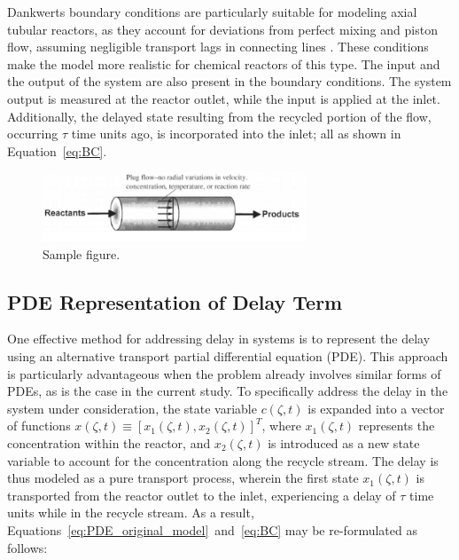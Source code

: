 Dankwerts boundary conditions are particularly suitable for modeling axial tubular reactors, as they account for deviations from perfect mixing and piston flow, assuming negligible transport lags in connecting lines \autocite{danckwerts1993continuous}. These conditions make the model more realistic for chemical reactors of this type. The input and the output of the system are also present in the boundary conditions. The system output is measured at the reactor outlet, while the input is applied at the inlet. Additionally, the delayed state resulting from the recycled portion of the flow, occurring $\tau$ time units ago, is incorporated into the inlet; all as shown in Equation~\ref{eq:BC}.


\begin{figure}[ht]
    \centering
    \includegraphics[width=0.7\textwidth]{Figures/sample.jpeg}
    \caption{Sample figure.}
    \label{fig:reactor_scheme}
\end{figure}

\subsection{PDE Representation of Delay Term}

One effective method for addressing delay in systems is to represent the delay using an alternative transport partial differential equation (PDE). This approach is particularly advantageous when the problem already involves similar forms of PDEs, as is the case in the current study. To specifically address the delay in the system under consideration, the state variable $c(\zeta, t)$ is expanded into a vector of functions $x(\zeta, t) \equiv [x_1(\zeta, t), x_2(\zeta, t)]^T$, where $x_1(\zeta, t)$ represents the concentration within the reactor, and $x_2(\zeta, t)$ is introduced as a new state variable to account for the concentration along the recycle stream. The delay is thus modeled as a pure transport process, wherein the first state $x_1(\zeta, t)$ is transported from the reactor outlet to the inlet, experiencing a delay of $\tau$ time units while in the recycle stream. As a result, Equations~\ref{eq:PDE_original_model}~and~\ref{eq:BC} may be re-formulated as follows:

